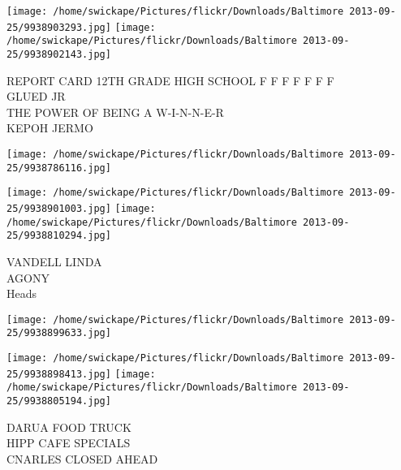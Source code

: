 \documentclass[10pt,letterpaper]{article}
\begin{document}
\texttt{[image: /home/swickape/Pictures/flickr/Downloads/Baltimore 2013-09-25/9938903293.jpg]}
\texttt{[image: /home/swickape/Pictures/flickr/Downloads/Baltimore 2013-09-25/9938902143.jpg]}

REPORT CARD 12TH GRADE HIGH SCHOOL F F F F F F F\\
GLUED JR\\
THE POWER OF BEING A W{-}I{-}N{-}N{-}E{-}R\\
KEPOH JERMO
\pagebreak

\texttt{[image: /home/swickape/Pictures/flickr/Downloads/Baltimore 2013-09-25/9938786116.jpg]}

\vspace{0.25in}
\texttt{[image: /home/swickape/Pictures/flickr/Downloads/Baltimore 2013-09-25/9938901003.jpg]}
\texttt{[image: /home/swickape/Pictures/flickr/Downloads/Baltimore 2013-09-25/9938810294.jpg]}

VANDELL LINDA\\
AGONY\\
Heads
\pagebreak

\texttt{[image: /home/swickape/Pictures/flickr/Downloads/Baltimore 2013-09-25/9938899633.jpg]}

\vspace{0.25in}
\texttt{[image: /home/swickape/Pictures/flickr/Downloads/Baltimore 2013-09-25/9938898413.jpg]}
\texttt{[image: /home/swickape/Pictures/flickr/Downloads/Baltimore 2013-09-25/9938805194.jpg]}

DARUA FOOD TRUCK\\
HIPP CAFE SPECIALS\\
CNARLES CLOSED AHEAD
\pagebreak
\end{document}
